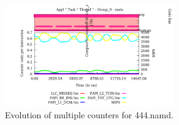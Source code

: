 \begin{figure}
  \centering
  \includegraphics[width=0.65\textwidth]{figures/user-guide/444_namd_ratio_per_instruction.pdf}
  \caption{Evolution of multiple counters for 444.namd.}
  \label{fig:444_namd_ratio_per_instruction}
\end{figure}
